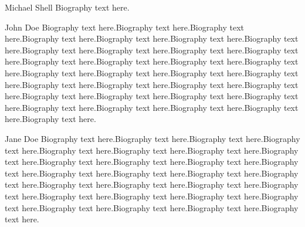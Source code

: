 \documentclass[10pt,journal,cspaper,compsoc]{IEEEtran}
\begin{document}
%

\begin{IEEEbiography}{Michael Shell}
Biography text here.
\end{IEEEbiography}

\begin{IEEEbiographynophoto}{John Doe}
Biography text here.Biography text here.Biography text here.Biography text here.Biography text here.Biography text here.Biography text here.Biography text here.Biography text here.Biography text here.Biography text here.Biography text here.Biography text here.Biography text here.Biography text here.Biography text here.Biography text here.Biography text here.Biography text here.Biography text here.Biography text here.Biography text here.Biography text here.Biography text here.Biography text here.Biography text here.Biography text here.Biography text here.Biography text here.Biography text here.Biography text here.Biography text here.
\end{IEEEbiographynophoto}


\begin{IEEEbiographynophoto}{Jane Doe}
Biography text here.Biography text here.Biography text here.Biography text here.Biography text here.Biography text here.Biography text here.Biography text here.Biography text here.Biography text here.Biography text here.Biography text here.Biography text here.Biography text here.Biography text here.Biography text here.Biography text here.Biography text here.Biography text here.Biography text here.Biography text here.Biography text here.Biography text here.Biography text here.Biography text here.Biography text here.Biography text here.Biography text here.
\end{IEEEbiographynophoto}






\end{document}
